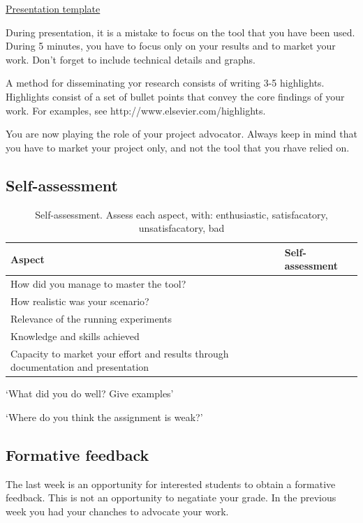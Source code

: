 \documentclass[a4paper,12pt]{report}
\begin{document}
\href{http://cs-gw.utcluj.ro/~srazvan/articleSchema.tgz}{Presentation template}

During presentation, it is a mistake to focus on the tool that you have been used. 
During 5 minutes, you have to focus only on your results and to market your work.
Don't forget to include technical details and graphs.

A method for disseminating yor research consists of writing 3-5 highlights.
Highlights consist of a set of bullet points 
that convey the core findings of your work.
For examples, see http://www.elsevier.com/highlights.

You are now playing the role of your project advocator. 
Always keep in mind that you have to market your project only, and not the tool that you rhave relied on.



\subsection{Self-assessment}

\begin{table}
\begin{tabular}{p{8cm}l}
Aspect & Self-assessment\\ \hline
How did you manage to master the tool?& \\
How realistic was your scenario? & \\
Relevance of the running experiments &\\
Knowledge and skills achieved & \\ 
Capacity to market your effort and results through documentation and presentation& \\
\hline
\end{tabular}
\caption{Self-assessment. Assess each aspect, with: enthusiastic, satisfacatory, unsatisfacatory, bad} 
\end{table}

‘What did you do well? Give examples’

‘Where do you think the assignment is weak?’


\subsection{Formative feedback}
The last week is an opportunity for interested students to obtain 
a formative feedback. 
This is not an opportunity to negatiate your grade. 
In the previous week you had your chanches to advocate your work. 
\end{document}
